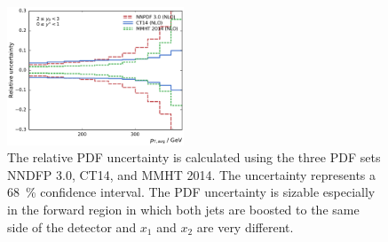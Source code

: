 \begin{figure}[htp]
    \includegraphics[width=0.47\textwidth]{figures/theory/pdf_uncert_comp_yb2ys0.pdf}
    \caption[PDF uncertainties]{The relative PDF uncertainty is calculated using the three PDF sets
        NNDFP 3.0, CT14, and MMHT 2014. The uncertainty represents a
        \SI{68}{\percent} confidence
    interval. The PDF uncertainty is sizable especially in the forward region in
    which both jets  are boosted to the same side of the detector and $x_1$ and
    $x_2$ are very different.}
    \label{fig:pdf_uncertainties}
\end{figure}

